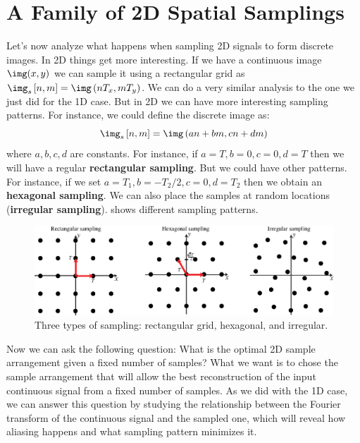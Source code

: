 

\section{A Family of 2D Spatial Samplings}

Let's now analyze what happens when sampling 2D signals to form discrete images. In 2D things get more interesting. If we have a continuous image $\img (x,y)$ we can sample it using a rectangular grid as $\img_s \left[n,m \right] = \img \left(nT_x, mT_y \right)$. We can do a very similar analysis to the one we just did for the 1D case. But in 2D we can have more interesting sampling patterns. For instance, we could define the discrete image as:
\begin{equation}
\img_s \left[n,m \right] = \img \left( an+bm, cn+dm \right)
\end{equation}
where $a,b,c,d$ are constants. For instance, if $a=T,b=0,c=0,d=T$ then we will have a regular {\bf rectangular sampling}. But we could have other patterns. For instance,  if we set $a=T_1,b=-T_2 / 2,c=0,d=T_2$ then we obtain an {\bf hexagonal sampling}. We can also place the samples at random locations ({\bf irregular sampling}). \Fig{\ref{fig:sampling_grids}} shows different sampling patterns. 

\begin{figure}
\centerline{
\includegraphics[width=1\linewidth]{figures/Image_processing_sampling/sampling_grids.eps}
}
\caption{Three types of sampling: rectangular grid, hexagonal, and irregular.}
\label{fig:sampling_grids}
\end{figure}

Now we can ask the following question: What is the optimal 2D sample arrangement given a fixed number of samples? What we want is to chose the sample arrangement that will allow the best reconstruction of the input continuous signal from a fixed number of samples. As we did with the 1D case, we can answer this question by studying the relationship between the Fourier transform of the continuous signal and the sampled one, which will reveal how aliasing happens and what sampling pattern minimizes it. 


